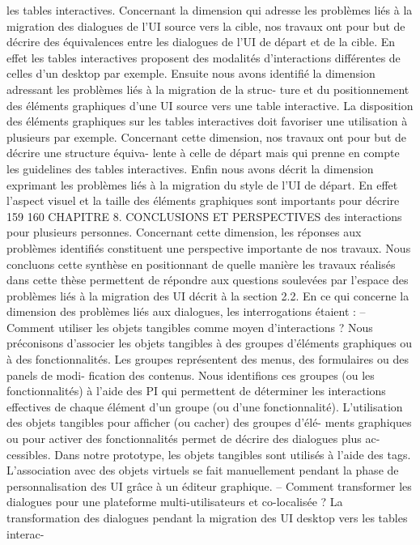 \documentclass{article}
\begin{document}
les tables interactives.
Concernant la dimension qui adresse les problèmes liés à la migration des dialogues de l’UI source
vers la cible, nos travaux ont pour but de décrire des équivalences entre les dialogues de l’UI de départ
et de la cible. En effet les tables interactives proposent des modalités d’interactions différentes de
celles d’un desktop par exemple.
Ensuite nous avons identiﬁé la dimension adressant les problèmes liés à la migration de la struc-
ture et du positionnement des éléments graphiques d’une UI source vers une table interactive. La
disposition des éléments graphiques sur les tables interactives doit favoriser une utilisation à plusieurs
par exemple. Concernant cette dimension, nos travaux ont pour but de décrire une structure équiva-
lente à celle de départ mais qui prenne en compte les guidelines des tables interactives.
Enﬁn nous avons décrit la dimension exprimant les problèmes liés à la migration du style de l’UI
de départ. En effet l’aspect visuel et la taille des éléments graphiques sont importants pour décrire
159
160
CHAPITRE 8. CONCLUSIONS ET PERSPECTIVES
des interactions pour plusieurs personnes. Concernant cette dimension, les réponses aux problèmes
identiﬁés constituent une perspective importante de nos travaux.
Nous concluons cette synthèse en positionnant de quelle manière les travaux réalisés dans cette
thèse permettent de répondre aux questions soulevées par l’espace des problèmes liés à la migration
des UI décrit à la section 2.2.
En ce qui concerne la dimension des problèmes liés aux dialogues, les interrogations étaient :
– Comment utiliser les objets tangibles comme moyen d’interactions ?
Nous préconisons d’associer les objets tangibles à des groupes d’éléments graphiques ou à des
fonctionnalités. Les groupes représentent des menus, des formulaires ou des panels de modi-
ﬁcation des contenus. Nous identiﬁons ces groupes (ou les fonctionnalités) à l’aide des PI qui
permettent de déterminer les interactions effectives de chaque élément d’un groupe (ou d’une
fonctionnalité). L’utilisation des objets tangibles pour afﬁcher (ou cacher) des groupes d’élé-
ments graphiques ou pour activer des fonctionnalités permet de décrire des dialogues plus ac-
cessibles. Dans notre prototype, les objets tangibles sont utilisés à l’aide des tags. L’association
avec des objets virtuels se fait manuellement pendant la phase de personnalisation des UI grâce
à un éditeur graphique.
– Comment transformer les dialogues pour une plateforme multi-utilisateurs et co-localisée ?
La transformation des dialogues pendant la migration des UI desktop vers les tables interac-
\end{document}
